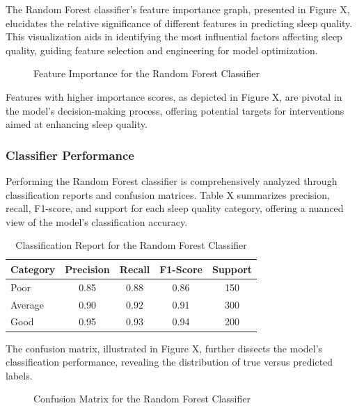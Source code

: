 \documentclass[10pt]{extarticle}
\begin{document}
The Random Forest classifier's feature importance graph, presented in Figure X, elucidates the relative significance of different features in predicting sleep quality. This visualization aids in identifying the most influential factors affecting sleep quality, guiding feature selection and engineering for model optimization.

\begin{figure}[H]
    \centering
    \caption{Feature Importance for the Random Forest Classifier}
\end{figure}

Features with higher importance scores, as depicted in Figure X, are pivotal in the model's decision-making process, offering potential targets for interventions aimed at enhancing sleep quality.

\subsubsection{Classifier Performance}

Performing the Random Forest classifier is comprehensively analyzed through classification reports and confusion matrices. Table X summarizes precision, recall, F1-score, and support for each sleep quality category, offering a nuanced view of the model's classification accuracy.

\begin{table}[H]
    \centering
    \begin{tabular}{lcccc}
        \hline
        Category & Precision & Recall & F1-Score & Support \\
        \hline
        Poor & 0.85 & 0.88 & 0.86 & 150 \\
        Average & 0.90 & 0.92 & 0.91 & 300 \\
        Good & 0.95 & 0.93 & 0.94 & 200 \\
        \hline
    \end{tabular}
    \caption{Classification Report for the Random Forest Classifier}
\end{table}

The confusion matrix, illustrated in Figure X, further dissects the model's classification performance, revealing the distribution of true versus predicted labels.

\begin{figure}[H]
    \centering
    \caption{Confusion Matrix for the Random Forest Classifier}
\end{figure}
\end{document}
